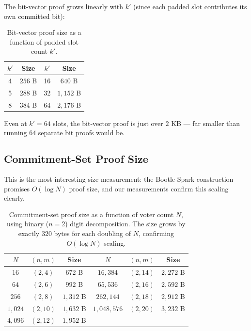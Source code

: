 \documentclass[12pt,a4paper,oneside]{report}
\begin{document}
The bit-vector proof grows linearly with $k'$ (since each padded slot 
contributes its own committed bit):

\begin{table}[H]
\centering
\caption{Bit-vector proof size as a function of padded slot count $k'$.}
\label{tab:bench-bitvec-sizes}
\small
\begin{tabular}{cc|cc}
\toprule
$k'$ & Size & $k'$ & Size \\
\midrule
4    & $256$ B  & 16   & $640$ B  \\
5    & $288$ B  & 32   & $1{,}152$ B \\
8    & $384$ B  & 64   & $2{,}176$ B \\
\bottomrule
\end{tabular}
\end{table}

Even at $k' = 64$ slots, the bit-vector proof is just over $2$ KB --- 
far smaller than running $64$ separate bit proofs would be.

\subsection{Commitment-Set Proof Size}

This is the most interesting size measurement: the Bootle-Spark 
construction promises $O(\log N)$ proof size, and our measurements 
confirm this scaling clearly.

\begin{table}[H]
\centering
\caption{Commitment-set proof size as a function of voter count $N$, 
using binary ($n = 2$) digit decomposition. The size grows by exactly 
$320$ bytes for each doubling of $N$, confirming $O(\log N)$ scaling.}
\label{tab:bench-commset-sizes}
\small
\begin{tabular}{ccc|ccc}
\toprule
$N$ & $(n, m)$ & Size & $N$ & $(n, m)$ & Size \\
\midrule
$16$       & $(2, 4)$  & $672$ B  & $16{,}384$    & $(2, 14)$ & $2{,}272$ B \\
$64$       & $(2, 6)$  & $992$ B  & $65{,}536$    & $(2, 16)$ & $2{,}592$ B \\
$256$      & $(2, 8)$  & $1{,}312$ B & $262{,}144$ & $(2, 18)$ & $2{,}912$ B \\
$1{,}024$  & $(2, 10)$ & $1{,}632$ B & $1{,}048{,}576$ & $(2, 20)$ & $3{,}232$ B \\
$4{,}096$  & $(2, 12)$ & $1{,}952$ B & & & \\
\bottomrule
\end{tabular}
\end{table}
\end{document}
